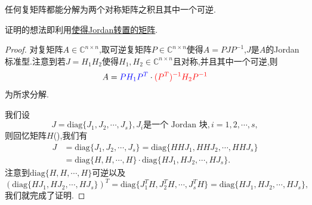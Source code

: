 \documentclass[../../main.tex]{subfiles}%
\begin{document}
\begin{proposition}
任何复矩阵都能分解为两个对称矩阵之积且其中一个可逆.
\end{proposition}
\begin{note}
证明的想法即利用\hyperref[lemma:使得Jordan转置的矩阵]{使得Jordan转置的矩阵}.
\end{note}
\begin{proof}

对复矩阵\( A \in \mathbb{C}^{n \times n} \),取可逆复矩阵\( P \in \mathbb{C}^{n \times n} \)使得\( A = P J P^{-1} \),\( J \)是\( A \)的Jordan标准型.注意到若\( J = H_1 H_2 \)使得\( H_1, H_2 \in \mathbb{C}^{n \times n} \)且对称,并且其中一个可逆,则
\[
A = {\color{blue} P H_1 P^T} \cdot {\color{red} (P^T)^{-1} H_2 P^{-1}}
\]
为所求分解.

我们设
\[
J = \text{diag}\{J_1, J_2, \cdots, J_s\}, J_i \text{是一个 Jordan 块}, i = 1, 2, \cdots, s,
\]
则回忆矩阵$H$(),我们有
\[
\begin{aligned}
J &= \text{diag}\{J_1, J_2, \cdots, J_s\} = \text{diag}\{HHJ_1, HHJ_2, \cdots, HHJ_s\} \\
&= \text{diag}\{H, H, \cdots, H\} \cdot \text{diag}\{HJ_1, HJ_2, \cdots, HJ_s\}.
\end{aligned}
\]
注意到\( \text{diag}\{H, H, \cdots, H\} \)可逆以及
\[
(\text{diag}\{HJ_1, HJ_2, \cdots, HJ_s\})^T = \text{diag}\{J_1^T H, J_2^T H, \cdots, J_s^T H\} = \text{diag}\{HJ_1, HJ_2, \cdots, HJ_s\},
\]
我们就完成了证明.

\end{proof}
\end{document}
